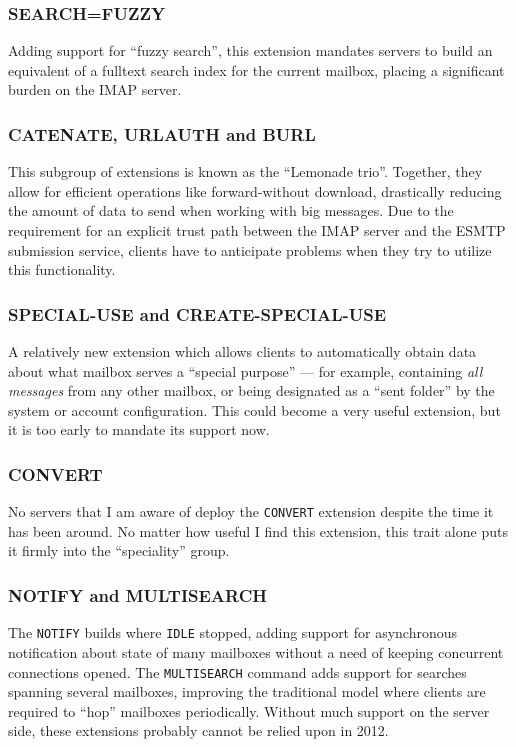 \documentclass[trojita]{subfiles}
\begin{document}
\subsubsection{SEARCH=FUZZY}

Adding support for ``fuzzy search'', this extension mandates servers to build an equivalent of a fulltext search index
for the current mailbox, placing a significant burden on the IMAP server.

\subsubsection{CATENATE, URLAUTH and BURL}

This subgroup of extensions is known as the ``Lemonade trio''.  Together, they allow for efficient operations like
forward-without download, drastically reducing the amount of data to send when working with big messages.  Due to the
requirement for an explicit trust path between the IMAP server and the ESMTP submission service, clients have to
anticipate problems when they try to utilize this functionality.

\subsubsection{SPECIAL-USE and CREATE-SPECIAL-USE}

A relatively new extension which allows clients to automatically obtain data about what mailbox serves a ``special
purpose'' --- for example, containing {\em all messages} from any other mailbox, or being designated as a ``sent
folder'' by the system or account configuration.  This could become a very useful extension, but it is too early to
mandate its support now.

\subsubsection{CONVERT}

No servers that I am aware of deploy the {\tt CONVERT} extension despite the time it has been around.  No matter how
useful I find this extension, this trait alone puts it firmly into the ``speciality'' group.

\subsubsection{NOTIFY and MULTISEARCH}

The {\tt NOTIFY} builds where {\tt IDLE} stopped, adding support for asynchronous notification about state of many
mailboxes without a need of keeping concurrent connections opened.  The {\tt MULTISEARCH} command adds support for
searches spanning several mailboxes, improving the traditional model where clients are required to ``hop'' mailboxes
periodically.  Without much support on the server side, these extensions probably cannot be relied upon in 2012.
\end{document}
